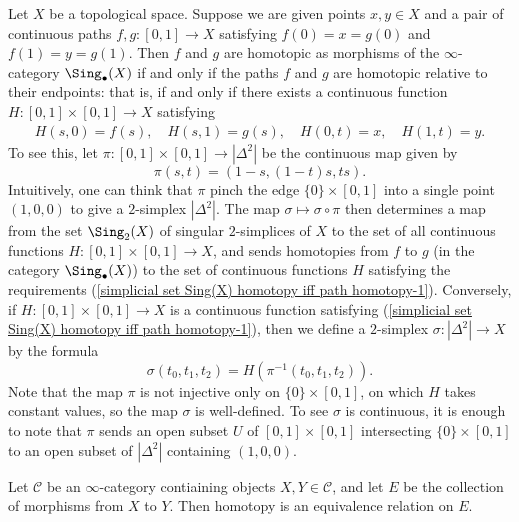 \begin{example}\label{simplicial set Sing(X) homotopy iff path homotopy}
Let $X$ be a topological space. Suppose we are given points $x,y\in X$ and a pair of continuous paths $f,g:[0,1]\to X$ satisfying $f(0)=x=g(0)$ and $f(1)=y=g(1)$. Then $f$ and $g$ are homotopic as morphisms of the $\infty$-category $\Sing_\bullet(X)$ if and only if the paths $f$ and $g$ are homotopic relative to their endpoints: that is, if and only if there exists a continuous function $H:[0,1]\times[0,1]\to X$ satisfying
\begin{align}\label{simplicial set Sing(X) homotopy iff path homotopy-1}
H(s,0)=f(s),\quad H(s,1)=g(s),\quad H(0,t)=x,\quad H(1,t)=y.
\end{align}
To see this, let $\pi:[0,1]\times[0,1]\to|\Delta^2|$ be the continuous map given by
\[\pi(s,t)=(1-s,(1-t)s,ts).\]
Intuitively, one can think that $\pi$ pinch the edge $\{0\}\times[0,1]$ into a single point $(1,0,0)$ to give a $2$-simplex $|\Delta^2|$. The map $\sigma\mapsto\sigma\circ\pi$ then determines a map from the set $\Sing_2(X)$ of singular $2$-simplices of $X$ to the set of all continuous functions $H:[0,1]\times[0,1]\to X$, and sends homotopies from $f$ to $g$ (in the category $\Sing_\bullet(X)$) to the set of continuous functions $H$ satisfying the requirements (\ref{simplicial set Sing(X) homotopy iff path homotopy-1}). Conversely, if $H:[0,1]\times[0,1]\to X$ is a continuous function satisfying (\ref{simplicial set Sing(X) homotopy iff path homotopy-1}), then we define a $2$-simplex $\sigma:|\Delta^2|\to X$ by the formula
\[\sigma(t_0,t_1,t_2)=H(\pi^{-1}(t_0,t_1,t_2)).\]
Note that the map $\pi$ is not injective only on $\{0\}\times[0,1]$, on which $H$ takes constant values, so the map $\sigma$ is well-defined. To see $\sigma$ is continuous, it is enough to note that $\pi$ sends an open subset $U$ of $[0,1]\times[0,1]$ intersecting $\{0\}\times[0,1]$ to an open subset of $|\Delta^2|$ containing $(1,0,0)$.
\end{example}
\begin{proposition}\label{simplicial set inf-cat homotopy is equivalence}
Let $\mathcal{C}$ be an $\infty$-category contiaining objects $X,Y\in\mathcal{C}$, and let $E$ be the collection of morphisms from $X$ to $Y$. Then homotopy is an equivalence relation on $E$.
\end{proposition}
